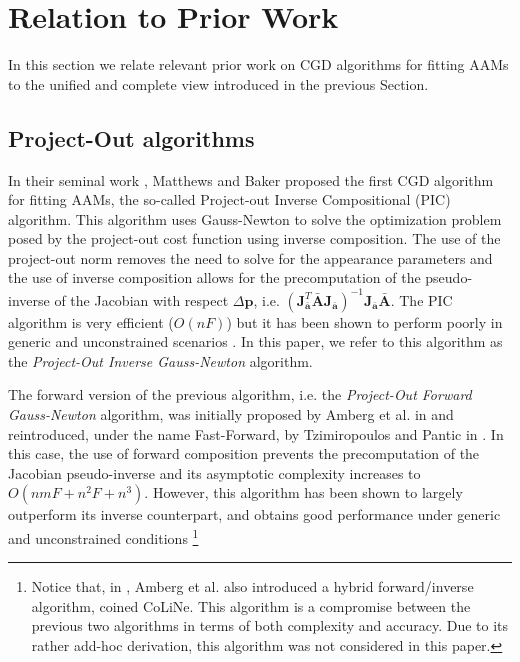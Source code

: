 \section{Relation to Prior Work}
\label{sec:relaltion}

In this section we relate relevant prior work on CGD algorithms for fitting AAMs \cite{Matthews2004, Gross2005, Papandreou2008, Amberg2009, Martins2010, Tzimiropoulos2013, Kossaifi2014} to the unified and complete view introduced in the previous Section.

\subsection{Project-Out algorithms}

In their seminal work \cite{Matthews2004}, Matthews and Baker proposed the first CGD algorithm for fitting AAMs, the so-called Project-out Inverse Compositional (PIC) algorithm. This algorithm uses Gauss-Newton to solve the optimization problem posed by the project-out cost function using inverse composition. The use of the project-out norm removes the need to solve for the appearance parameters and the use of inverse composition allows for the precomputation of the pseudo-inverse of the Jacobian with respect $\Delta\mathbf{p}$, i.e. $\left( \mathbf{J}_{\bar{\mathbf{a}}}^T\bar{\mathbf{A}}\mathbf{J}_{\bar{\mathbf{a}}} \right)^{-1}\mathbf{J}_{\bar{\mathbf{a}}}\bar{\mathbf{A}}$. The PIC algorithm is very efficient ($O(nF)$) but it has been shown to perform poorly in generic and unconstrained scenarios \cite{Gross2005, Papandreou2008}. In this paper, we refer to this algorithm as the \emph{Project-Out Inverse Gauss-Newton} algorithm.

The forward version of the previous algorithm, i.e. the \emph{Project-Out Forward Gauss-Newton} algorithm, was initially proposed by Amberg et al. in \cite{Amberg2009} and reintroduced, under the name Fast-Forward, by Tzimiropoulos and Pantic in \cite{Tzimiropoulos2013}. In this case, the use of forward composition prevents the precomputation of the Jacobian pseudo-inverse and its asymptotic complexity increases to $O(nmF + n^2F + n^3)$. However, this algorithm has been shown to largely outperform its inverse counterpart, and obtains good performance under generic and unconstrained conditions \cite{Amberg2009, Tzimiropoulos2013}\footnote{Notice that, in \cite{Amberg2009}, Amberg et al. also introduced a hybrid forward/inverse algorithm, coined CoLiNe. This algorithm is a compromise between the previous two algorithms in terms of both complexity and accuracy. Due to its rather add-hoc derivation, this algorithm was not considered in this paper.}

